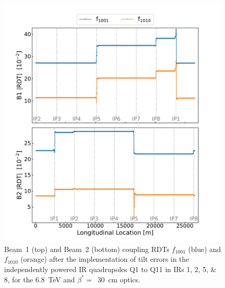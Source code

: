 \begin{figure}[!htb]
    \centering
    \includegraphics*[width=0.99\textwidth]{Figures/ML_for_IR_Coupling/ml_local_sources_rdts_combined.pdf}
    \caption{Beam~\num{1} (top) and Beam~\num{2} (bottom) coupling RDTs \(f_{1001}\) (\textcolor{mplblue}{blue}) and \(f_{1010}\) (\textcolor{mplorange}{orange}) after the implementation of tilt errors in the independently powered IR quadrupoles Q\num{1} to Q\num{11} in IRs \numlist{1;2;5;8}, for the \qty{6.8}{\tera\electronvolt} and \(\beta^{\ast}=\)~\qty{30}{\centi\meter} optics.}
    \label{figure:ml_local_sources_rdts}
\end{figure}

